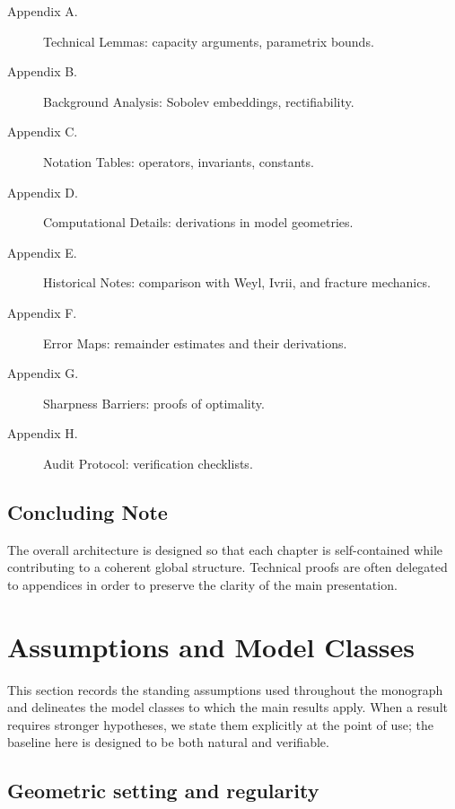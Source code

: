 \begin{description}
    \item[Appendix A.] Technical Lemmas: capacity arguments, parametrix bounds.
    \item[Appendix B.] Background Analysis: Sobolev embeddings, rectifiability.
    \item[Appendix C.] Notation Tables: operators, invariants, constants.
    \item[Appendix D.] Computational Details: derivations in model geometries.
    \item[Appendix E.] Historical Notes: comparison with Weyl, Ivrii, and 
    fracture mechanics.
    \item[Appendix F.] Error Maps: remainder estimates and their derivations.
    \item[Appendix G.] Sharpness Barriers: proofs of optimality.
    \item[Appendix H.] Audit Protocol: verification checklists.
\end{description}

\subsection*{Concluding Note}

The overall architecture is designed so that each chapter is self-contained 
while contributing to a coherent global structure. Technical proofs are often 
delegated to appendices in order to preserve the clarity of the main 
presentation.



\section{Assumptions and Model Classes}
\label{sec:intro-assumptions-models}

This section records the standing assumptions used throughout the monograph
and delineates the model classes to which the main results apply. When a
result requires stronger hypotheses, we state them explicitly at the point
of use; the baseline here is designed to be both natural and verifiable.

\subsection{Geometric setting and regularity}
\label{sub:intro-geom-regularity}

